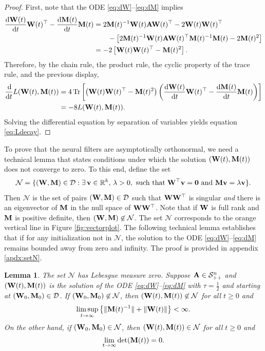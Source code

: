 \documentclass[11pt]{article}
\newtheorem{lemma}{Lemma}
\theoremstyle{definition}
\DeclareMathOperator{\tr}{Tr}
\newcommand{\dd}{\operatorname{d}\!}
\renewcommand{\v}{{\bf v}}
\newcommand{\A}{{\bf A}}
\newcommand{\M}{{\bf M}}
\newcommand{\R}{\mathbb{R}}
\newcommand{\W}{{\bf W}}
\newcommand{\calD}{\mathcal{D}}
\newcommand{\calN}{\mathcal{N}}
\newcommand{\calS}{\mathcal{S}}
\begin{document}
\begin{proof}
First, note that the ODE \eqref{eq:dW}--\eqref{eq:dM} implies
\begin{align*}
    \frac{\dd\W(t)}{\dd t}\W(t)^\top-\frac{\dd\M(t)}{\dd t}\M(t)&=2\M(t)^{-1}\W(t) \A\W(t)^\top -2\W(t)\W(t)^\top\\
    &\qquad-\left[2\M(t)^{-1}\W(t)\A\W(t)^\top\M(t)^{-1}\M(t)-2\M(t)^2\right]\\
    &=-2\left[\W(t)\W(t)^\top-\M(t)^2\right].
\end{align*}
Therefore, by the chain rule, the product rule, the cyclic property of the trace rule, and the previous display,
\begin{align*}
    \frac{\dd}{\dd t}L(\W(t),\M(t))&=4\tr\left[\left(\W(t)\W(t)^\top-\M(t)^2\right)\left(\frac{\dd \W(t)}{\dd t}\W(t)^\top-\frac{\dd \M(t)}{\dd t}\M(t)\right)\right]\\
    &=-8L(\W(t),\M(t)).
\end{align*}
Solving the differential equation by separation of variables yields equation \eqref{eq:Ldecay}. 
\end{proof}

To prove that the neural filters are asymptotically orthonormal, we need a technical lemma that states conditions under which the solution $(\W(t),\M(t))$ does not converge to zero.
To this end, define the set
\begin{equation}\label{eq:calN}
    \calN=\{(\W,\M)\in\calD: \exists\,\v\in\R^k,\,\lambda>0, \text{ such that}\;\W^\top\v={\bf 0}\text{ and } \M\v=\lambda\v\}.
\end{equation}
Then $\calN$ is the set of pairs $(\W,\M)\in\calD$ such that $\W\W^\top$ is singular \textit{and} there is an eigenvector of $\M$ in the null space of $\W\W^\top$. 
Note that if $\W$ is full rank and $\M$ is positive definite, then $(\W,\M)\not\in\calN$.
The set $\calN$ corresponds to the orange vertical line in Figure \ref{fig:vectorplot}. The following technical lemma establishes that if for any initialization not in $\calN$, the solution to the ODE \eqref{eq:dW}--\eqref{eq:dM} remains bounded away from zero and infinity.
The proof is provided in appendix \ref{apdx:setN}.

\begin{lemma}\label{lem:setN}
The set $\calN$ has Lebesgue measure zero. Suppose $\A\in\calS_{++}^n$ and $(\W(t),\M(t))$ is the solution of the ODE \eqref{eq:dW}--\eqref{eq:dM} with $\tau=\frac12$ and starting at $(\W_0,\M_0)\in\calD$. If $(\W_0,\M_0)\not\in\calN$, then $(\W(t),\M(t))\not\in\calN$ for all $t\ge0$ and
\begin{align*}
    \limsup_{t\to\infty}\left\{\|\M(t)^{-1}\|+\|\W(t)\|\right\}<\infty.
\end{align*}
On the other hand, if $(\W_0,\M_0)\in\calN$, then $(\W(t),\M(t))\in\calN$ for all $t\ge0$ and 
\begin{align*}
    \lim_{t\to\infty}\det(\M(t))=0.
\end{align*}
\end{lemma}
\end{document}
